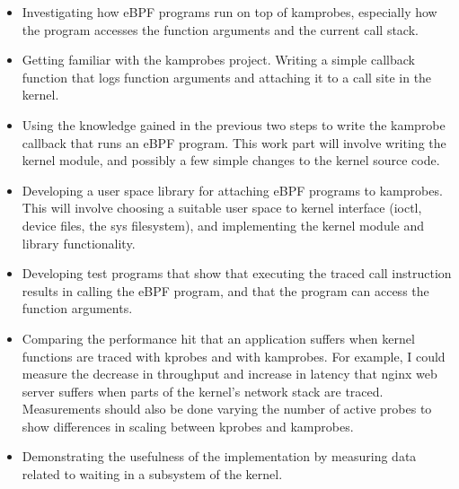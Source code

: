     \begin{itemize}
        \item Investigating how eBPF programs run on top of kamprobes, especially how the program
        accesses the function arguments and the current call stack.
       
        \item Getting familiar with the kamprobes project. Writing a simple callback function that logs 
        function arguments and attaching it to a call site in the kernel.

        \item Using the knowledge gained in the previous two steps to write the kamprobe callback that runs
        an eBPF program. This work part will involve writing the kernel module, and possibly a few simple
        changes to the kernel source code.

        \item Developing a user space library for attaching eBPF programs to kamprobes. This will involve 
        choosing a suitable user space to kernel interface (ioctl, device files, the sys filesystem),
        and implementing the kernel module and library functionality. %

        \item Developing test programs that show that executing the traced call instruction results in calling the 
        eBPF program, and that the program can access the function arguments.



        \item Comparing the performance hit that an application suffers when kernel functions are traced with kprobes
        and with kamprobes. 
        For example, I could measure the decrease in throughput and increase in latency that nginx web server suffers
        when parts of the kernel's network stack are traced.
        Measurements should also be done varying the number of active probes to show differences in scaling
        between kprobes and kamprobes.

        \item Demonstrating the usefulness of the implementation by measuring data related to waiting in a subsystem
        of the kernel.
    \end{itemize}



